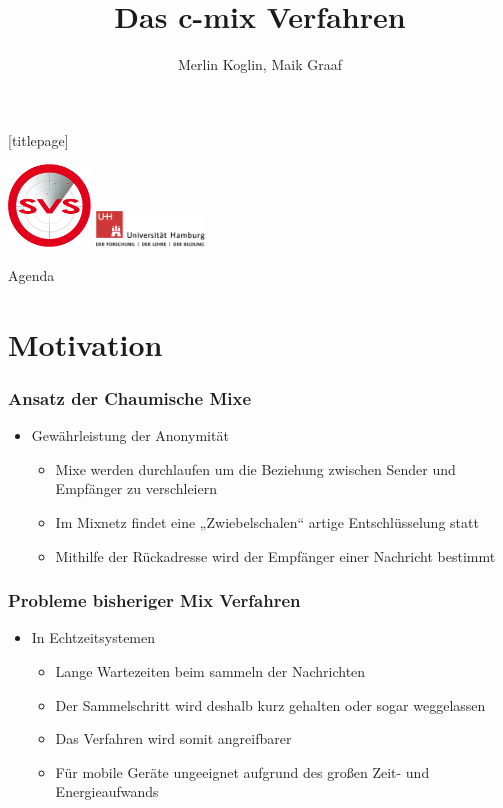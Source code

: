\documentclass[t, xcolor=dvipsnames]{beamer}
\title{Das c-mix Verfahren }
\author[Merlin Koglin, Maik Graaf]{Merlin Koglin, Maik Graaf}
\date{}
\begin{document}
\begingroup
	[titlepage]
	\begin{frame}[plain]
		\vskip8mm
		\includegraphics[width=2.2cm]{pic/svs_logo_uhhred.png}
		\titlepage
		\vspace{\fill}
		\includegraphics[width=2.9cm]{pic/UHH-Logo_2010_Farbe_RGB_hires_nomargin.png}
		\vskip20pt
	\end{frame}
\endgroup

\begin{frame}{Agenda}
	\tableofcontents
\end{frame}

\section{Motivation} %


\begin{frame}
	\frametitle{Ansatz der Chaumische Mixe}
	\begin{itemize}
		\item Gewährleistung der Anonymität
			\begin{itemize}
				\item Mixe werden durchlaufen um die Beziehung zwischen Sender und Empfänger zu verschleiern
		        \item Im Mixnetz findet eine „Zwiebelschalen“ artige Entschlüsselung statt
		        \item Mithilfe der Rückadresse wird der Empfänger einer Nachricht bestimmt
			\end{itemize}
	\end{itemize}
	\vspace{\fill}
\end{frame}

\begin{frame}
	\frametitle{Probleme bisheriger Mix Verfahren}
	\begin{itemize}
		\item In Echtzeitsystemen
			\begin{itemize}
				\item Lange Wartezeiten beim sammeln der Nachrichten
				\item Der Sammelschritt wird deshalb kurz gehalten oder sogar weggelassen
				\item Das Verfahren wird somit angreifbarer
				\item Für mobile Geräte ungeeignet aufgrund des großen Zeit- und Energieaufwands
			\end{itemize}
	\end{itemize}
	\vspace{\fill}
\end{frame}
\end{document}

